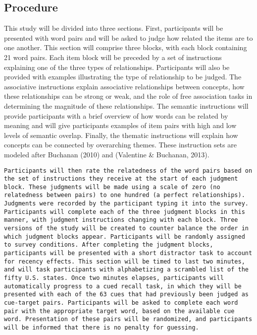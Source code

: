 \documentclass[english,man]{apa6}
\theoremstyle{definition}
\theoremstyle{definition}
\theoremstyle{definition}
\theoremstyle{remark}
\begin{document}
\subsection{Procedure}\label{procedure}

This study will be divided into three sections. First, participants will
be presented with word pairs and will be asked to judge how related the
items are to one another. This section will comprise three blocks, with
each block containing 21 word pairs. Each item block will be preceded by
a set of instructions explaining one of the three types of
relationships. Participants will also be provided with examples
illustrating the type of relationship to be judged. The associative
instructions explain associative relationships between concepts, how
these relationships can be strong or weak, and the role of free
association tasks in determining the magnitude of these relationships.
The semantic instructions will provide participants with a brief
overview of how words can be related by meaning and will give
participants examples of item pairs with high and low levels of semantic
overlap. Finally, the thematic instructions will explain how concepts
can be connected by overarching themes. These instruction sets are
modeled after Buchanan (2010) and (Valentine \& Buchanan, 2013).

\begin{verbatim}
Participants will then rate the relatedness of the word pairs based on the set of instructions they receive at the start of each judgment block. These judgments will be made using a scale of zero (no relatedness between pairs) to one hundred (a perfect relationships). Judgments were recorded by the participant typing it into the survey. Participants will complete each of the three judgment blocks in this manner, with judgment instructions changing with each block. Three versions of the study will be created to counter balance the order in which judgment blocks appear. Participants will be randomly assigned to survey conditions. After completing the judgment blocks, participants will be presented with a short distractor task to account for recency effects. This section will be timed to last two minutes, and will task participants with alphabetizing a scrambled list of the fifty U.S. states. Once two minutes elapses, participants will automatically progress to a cued recall task, in which they will be presented with each of the 63 cues that had previously been judged as cue-target pairs. Participants will be asked to complete each word pair with the appropriate target word, based on the available cue word. Presentation of these pairs will be randomized, and participants will be informed that there is no penalty for guessing. 
\end{verbatim}
\end{document}
